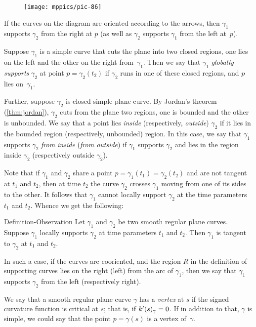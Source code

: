 \begin{wrapfigure}[8]{o}{43 mm}
\vskip-3mm
\centering
\texttt{[image: mppics/pic-86]}
\vskip0mm
\end{wrapfigure}

If the curves on the diagram are oriented according to the arrows, then $\gamma_1$ supports $\gamma_2$ from the right at $p$ (as well as $\gamma_2$ supports $\gamma_1$ from the left at~$p$).

Suppose $\gamma_1$ is a simple curve that cuts the plane into two closed regions, one lies on the left and the other on the right from~$\gamma_1$.
Then we say that $\gamma_1$ \emph{globally supports} $\gamma_2$ at point $p=\gamma_2(t_2)$ 
if $\gamma_2$ runs in one of these closed regions, and 
$p$ lies on~$\gamma_1$.

Further, suppose $\gamma_2$ is closed simple plane curve.
By Jordan's theorem (\ref{thm:jordan}), $\gamma_2$ cuts from the plane two regions, one is bounded and the other is unbounded.
We say that a point lies {}\emph{inside} (respectively, {}\emph{outside}) $\gamma_2$ if it lies in the bounded region (respectively, unbounded) region.
In this case, we say that $\gamma_1$ supports $\gamma_2$ \emph{from inside} (\emph{from outside}) if $\gamma_1$ supports $\gamma_2$ and lies in the region inside $\gamma_2$ (respectively outside $\gamma_2$). 

Note that if $\gamma_1$ and $\gamma_2$ share a point $p=\gamma_1(t_1)=\gamma_2(t_2)$ and are not tangent at $t_1$ and $t_2$, then at time $t_2$ the curve $\gamma_2$ crosses $\gamma_1$  moving from one of its sides to the other.
It follows that $\gamma_1$ cannot locally support $\gamma_2$ at the time parameters $t_1$ and $t_2$.
Whence we get the following:

\begin{thm}{Definition-Observation}
Let $\gamma_1$ and $\gamma_2$ be two smooth regular plane curves.
Suppose $\gamma_1$ locally supports $\gamma_2$ at time parameters $t_1$ and $t_2$.
Then $\gamma_1$ is tangent to $\gamma_2$ at $t_1$ and $t_2$.

In such a case, if the curves are cooriented, and the region $R$ in the definition of supporting curves lies on the right (left) from the arc of $\gamma_1$, then we say that 
$\gamma_1$ supports $\gamma_2$ from the left (respectively right).
\end{thm}

We say that a smooth regular plane curve $\gamma$ has a \emph{vertex} at $s$
if the signed curvature function is critical at $s$;
that is, if $k'(s)_\gamma=0$.
If in addition to that, $\gamma$ is simple, we could say that the point $p=\gamma(s)$ is a vertex of~$\gamma$.

